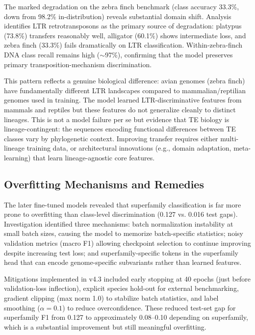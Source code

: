 \documentclass[12pt]{article}
\begin{document}
The marked degradation on the zebra finch benchmark (class accuracy 33.3\%, down from 98.2\% in-distribution) reveals substantial domain shift. Analysis identifies LTR retrotransposons as the primary source of degradation: platypus (73.8\%) transfers reasonably well, alligator (60.1\%) shows intermediate loss, and zebra finch (33.3\%) fails dramatically on LTR classification. Within-zebra-finch DNA class recall remains high ($\sim$97\%), confirming that the model preserves primary transposition-mechanism discrimination. 

This pattern reflects a genuine biological difference: avian genomes (zebra finch) have fundamentally different LTR landscapes compared to mammalian/reptilian genomes used in training. The model learned LTR-discriminative features from mammals and reptiles but these features do not generalize cleanly to distinct lineages. This is not a model failure per se but evidence that TE biology is lineage-contingent: the sequences encoding functional differences between TE classes vary by phylogenetic context. Improving transfer requires either multi-lineage training data, or architectural innovations (e.g., domain adaptation, meta-learning) that learn lineage-agnostic core features.

\subsection{Overfitting Mechanisms and Remedies}

The later fine-tuned models revealed that superfamily classification is far more prone to overfitting than class-level discrimination (0.127 vs. 0.016 test gaps). Investigation identified three mechanisms: batch normalization instability at small batch sizes, causing the model to memorize batch-specific statistics; noisy validation metrics (macro F1) allowing checkpoint selection to continue improving despite increasing test loss; and superfamily-specific tokens in the superfamily head that can encode genome-specific subvariants rather than learned features. 

Mitigations implemented in v4.3 included early stopping at 40 epochs (just before validation-loss inflection), explicit species hold-out for external benchmarking, gradient clipping (max norm 1.0) to stabilize batch statistics, and label smoothing ($\alpha = 0.1$) to reduce overconfidence. These reduced test-set gap for superfamily F1 from 0.127 to approximately 0.08--0.10 depending on superfamily, which is a substantial improvement but still meaningful overfitting.
\end{document}
